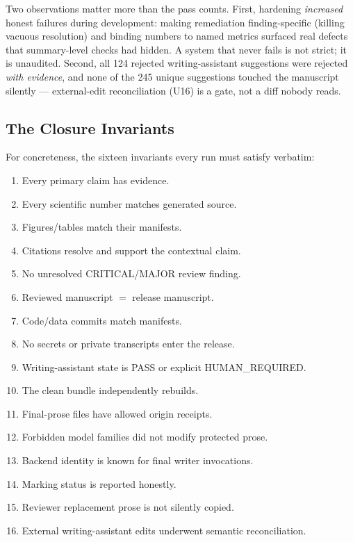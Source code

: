 \documentclass[10pt,twocolumn]{article}
\begin{document}
Two observations matter more than the pass counts. First, hardening
\emph{increased} honest failures during development: making remediation
finding-specific (killing vacuous resolution) and binding numbers to named
metrics surfaced real defects that summary-level checks had hidden. A system
that never fails is not strict; it is unaudited. Second, all 124 rejected
writing-assistant suggestions were rejected \emph{with evidence}, and none
of the 245 unique suggestions touched the manuscript silently --- external-edit reconciliation (U16) is a
gate, not a diff nobody reads.

\subsection{The Closure Invariants}

For concreteness, the sixteen invariants every run must satisfy verbatim:

\begin{enumerate}[label=\textbf{U\arabic*.},leftmargin=2.6em]
\item Every primary claim has evidence.
\item Every scientific number matches generated source.
\item Figures/tables match their manifests.
\item Citations resolve and support the contextual claim.
\item No unresolved CRITICAL/MAJOR review finding.
\item Reviewed manuscript $=$ release manuscript.
\item Code/data commits match manifests.
\item No secrets or private transcripts enter the release.
\item Writing-assistant state is PASS or explicit HUMAN\_REQUIRED.
\item The clean bundle independently rebuilds.
\item Final-prose files have allowed origin receipts.
\item Forbidden model families did not modify protected prose.
\item Backend identity is known for final writer invocations.
\item Marking status is reported honestly.
\item Reviewer replacement prose is not silently copied.
\item External writing-assistant edits underwent semantic reconciliation.
\end{enumerate}
\end{document}
